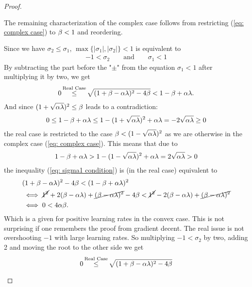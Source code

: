 \begin{proof}
\begin{description}[wide, labelindent=0pt]
		The remaining characterization of the complex case follows from
		restricting (\ref{eq: complex case}) to \(\beta<1\) and reordering.
		\item[Real Case:] Since we have \(\sigma_2 \le \sigma_1\),
		\(\max\{|\sigma_1|,|\sigma_2|\}<1\) is equivalent to
		\begin{align*}
			-1 < \sigma_2 \qquad \text{and} \qquad \sigma_1 < 1
		\end{align*}
		By subtracting the part before the "\(\pm\)" from the equation \(\sigma_1<1\)
		after multiplying it by two, we get
		\begin{align}\label{eq: sigma1 condition}
			0\xle{\text{Real Case}} \sqrt{(1+\momCoeff-\lrSq\hesseEV)^2 -4\momCoeff} < 1-\momCoeff +\lrSq\hesseEV.
		\end{align}
		And since \((1+\sqrt{\alpha\lambda})^2 \le \beta\) leads to a contradiction:
		\begin{align*}
			0 \le 1-\beta+\alpha\lambda \le 1-(1+\sqrt{\alpha\lambda})^2 +\alpha\lambda
			= -2\sqrt{\alpha\lambda} \ge 0
		\end{align*}
		the real case is restricted to the case \(\beta < (1-\sqrt{\alpha\lambda})^2\)
		as we are otherwise in the complex case (\ref{eq: complex case}).
		This means that due to
		\begin{align*}
			1-\beta+\alpha\lambda
			> 1 - (1-\sqrt{\alpha\lambda})^2 + \alpha\lambda
			= 2\sqrt{\alpha\lambda}>0
		\end{align*}
		the inequality (\ref{eq: sigma1 condition}) is (in the real case) equivalent to
		\begin{align*}
			&(1+\beta-\alpha\lambda)^2 - 4\beta < (1-\beta+\alpha\lambda)^2\\
			&\iff \cancel{1^2} + 2(\beta-\alpha\lambda) + 
			\cancel{(\beta-\alpha\lambda)^2} - 4\beta
			< \cancel{1^2} - 2(\beta-\alpha\lambda) + 
			\cancel{(\beta-\alpha\lambda)^2}\\
			&\iff 0 < 4\alpha\beta.
		\end{align*}
		Which is a given for positive learning rates in the convex	
		case. This is not surprising if one remembers the proof from gradient
		decent. The real issue is not overshooting \(-1\) with large learning
		rates. So multiplying \(-1<\sigma_2\) by two, adding 2 and moving the
		root to the other side we get
		\begin{align}\label{eq: from -1<sigma_2 followed}
			0 \xle{\text{Real Case}} \sqrt{(1+\momCoeff-\lrSq\hesseEV)^2 - 4\momCoeff}

\end{align}
\end{description}
\end{proof}
